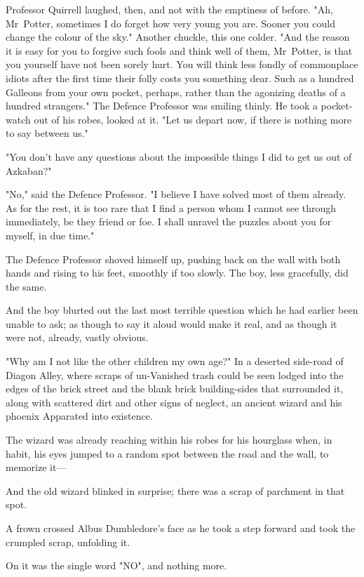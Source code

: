 Professor Quirrell laughed, then, and not with the emptiness of before. "Ah,
Mr~Potter, sometimes I do forget how very young you are. Sooner you could
change the colour of the sky." Another chuckle, this one colder. "And the reason
it is easy for you to forgive such fools and think well of them, Mr~Potter, is
that you yourself have not been sorely hurt. You will think less fondly of
commonplace idiots after the first time their folly costs you something dear.
Such as a hundred Galleons from your own pocket, perhaps, rather than the
agonizing deaths of a hundred strangers." The Defence Professor was smiling
thinly. He took a pocket-watch out of his robes, looked at it. "Let us depart
now, if there is nothing more to say between us."

"You don't have any questions about the impossible things I did to get us out
of Azkaban?"

"No," said the Defence Professor. "I believe I have solved most of them
already. As for the rest, it is too rare that I find a person whom I cannot see
through immediately, be they friend or foe. I shall unravel the puzzles about
you for myself, in due time."

The Defence Professor shoved himself up, pushing back on the wall with both
hands and rising to his feet, smoothly if too slowly. The boy, less gracefully,
did the same.

And the boy blurted out the last most terrible question which he had earlier
been unable to ask; as though to say it aloud would make it real, and as though
it were not, already, vastly obvious.

"Why am I not like the other children my own age?"
\later
In a deserted side-road of Diagon Alley, where scraps of un-Vanished trash
could be seen lodged into the edges of the brick street and the blank brick
building-sides that surrounded it, along with scattered dirt and other signs of
neglect, an ancient wizard and his phoenix Apparated into existence.

The wizard was already reaching within his robes for his hourglass when, in
habit, his eyes jumped to a random spot between the road and the wall, to
memorize it—

And the old wizard blinked in surprise; there was a scrap of parchment in that
spot.

A frown crossed Albus Dumbledore's face as he took a step forward and took the
crumpled scrap, unfolding it.

On it was the single word "NO", and nothing more.

